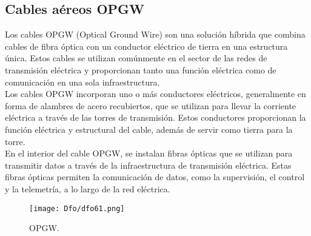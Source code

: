 \documentclass[
	12pt, %
	fleqn, %
	a4paper, %
	oneside, %
]{LegrandOrangeBook}
\begin{document}
\subsection{Cables aéreos OPGW}
Los cables OPGW (Optical Ground Wire) son una solución híbrida que combina cables de fibra óptica con un conductor eléctrico de tierra en una estructura única. Estos cables se utilizan comúnmente en el sector de las redes de transmisión eléctrica y proporcionan tanto una función eléctrica como de comunicación en una sola infraestructura.\\
Los cables OPGW incorporan uno o más conductores eléctricos, generalmente en forma de alambres de acero recubiertos, que se utilizan para llevar la corriente eléctrica a través de las torres de transmisión. Estos conductores proporcionan la función eléctrica y estructural del cable, además de servir como tierra para la torre.\\
En el interior del cable OPGW, se instalan fibras ópticas que se utilizan para transmitir datos a través de la infraestructura de transmisión eléctrica. Estas fibras ópticas permiten la comunicación de datos, como la supervisión, el control y la telemetría, a lo largo de la red eléctrica.
\begin{figure}[H]
\centering
\texttt{[image: Dfo/dfo61.png]}
\caption{OPGW.}
\end{figure}
\end{document}
